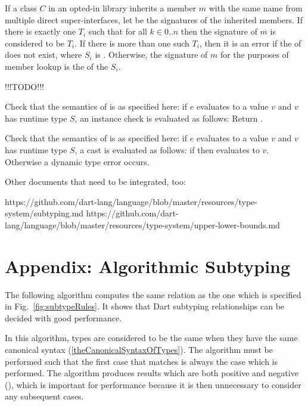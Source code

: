 \documentclass[makeidx]{article}
\begin{document}
If a class $C$ in an opted-in library inherits a member $m$ with the same name
from multiple direct super-interfaces, let
 be the signatures of the inherited members.  If there is exactly one
$T_i$ such that  for all $k \in 0 .. n$ then the signature
of $m$ is considered to be $T_i$.  If there is more than one such $T_i$, then it
is an error if the \TopMergeTypeName{} of  does not exist, where $S_i$
is .  Otherwise, the signature of $m$ for the purposes of member
lookup is the \TopMergeTypeName{} of the $S_i$.

!!!TODO!!!

Check that the semantics of \IS{} is as specified here:
if $e$ evaluates to a value $v$ and $v$ has
runtime type $S$, an instance check  is evaluated as follows:
Return .

Check that the semantics of \AS{} is as specified here:
if $e$ evaluates to a value $v$ and $v$ has
runtime type $S$, a cast  is evaluated as follows:
if  then  evaluates to $v$.
Otherwise a dynamic type error occurs.

Other documents that need to be integrated, too:

https://github.com/dart-lang/language/blob/master/resources/type-system/subtyping.md
https://github.com/dart-lang/language/blob/master/resources/type-system/upper-lower-bounds.md

\section*{Appendix: Algorithmic Subtyping}

\LMHash{}%
The following algorithm computes the same relation as
the one which is specified in Fig.~\ref{fig:subtypeRules}.
It shows that Dart subtyping relationships can be decided
with good performance.

\LMHash{}%
In this algorithm, types are considered to be the same when they have
the same canonical syntax
(\ref{theCanonicalSyntaxOfTypes}).
The algorithm must be performed such that the first case that matches
is always the case which is performed.
The algorithm produces results which are both positive and negative
(),
which is important for performance because
it is then unnecessary to consider any subsequent cases.
\end{document}
